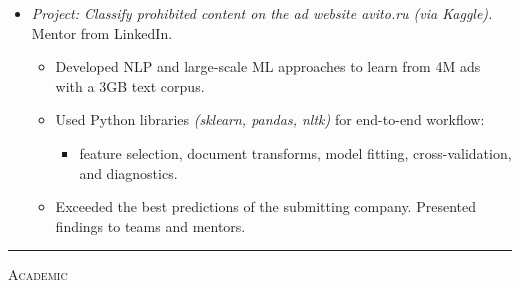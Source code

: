 \documentclass[10pt,letterpaper]{article}
\begin{document}
\begin{minipage}{0.95\textwidth}
\begin{itemize}
            \begin{itemize}
                \item \emph{Project: Classify prohibited content on the ad website avito.ru (via Kaggle).} Mentor from LinkedIn.
                \begin{itemize}
                    \item Developed NLP and large-scale ML approaches to learn from 4M ads with a 3GB text corpus.
                    \item Used Python libraries \emph{(sklearn, pandas, nltk)} for end-to-end workflow:
                    \begin{itemize}
                        \item feature selection, document transforms, model fitting, cross-validation, and diagnostics.
                    \end{itemize}
                    \item Exceeded the best predictions of the submitting company. Presented findings to teams and mentors.
                \end{itemize}
            \end{itemize}
    \end{itemize}
    \par\nopagebreak\smallskip\hrule\smallskip
\end{minipage}
\begin{minipage}{0.05\textwidth}
    \begin{sideways}\textsc{Academic}\end{sideways}
\end{minipage}
\end{document}
